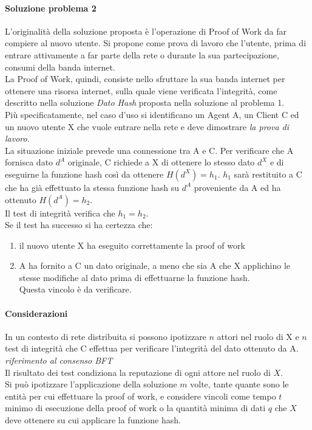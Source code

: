 \documentclass[]{article}
\begin{document}
	\paragraph{Soluzione problema 2}
	L'originalità della soluzione proposta è l'operazione di Proof of Work da far compiere al nuovo utente. Si propone come prova di lavoro che l'utente, prima di entrare attivamente a far parte della rete o durante la sua partecipazione, consumi della banda internet.\\
	La Proof of Work, quindi, consiste nello sfruttare la sua banda internet per ottenere una risorsa internet, sulla quale viene verificata l'integrità, come descritto nella soluzione \textit{Dato Hash} proposta nella soluzione al problema 1.\\ 
	Più specificatamente, nel caso d'uso si identificano un Agent A, un Client C ed un nuovo utente X che vuole entrare nella rete e deve dimostrare \textit{la prova di lavoro}.\\
	La situazione iniziale prevede una connessione tra A e C. Per verificare che A fornisca dato $d^A$ originale, C richiede a X di ottenere lo stesso dato $d^X$ e di eseguirne la funzione hash così da ottenere  $H(d^X)=h_1$. $h_1$ sarà restituito a C che ha già effettuato la stessa funzione hash su $d^A$ proveniente da A ed ha ottenuto $H(d^A) = h_2$.\\
	Il test di integrità verifica che $h_1 = h_2$.\\
	Se il test ha successo si ha certezza che:
	\begin{enumerate}
		\item il nuovo utente X ha eseguito correttamente la proof of work 
		\item A ha fornito a C un dato originale, a meno che sia A che X applichino le stesse modifiche al dato prima di effettuarne la funzione hash.\\Questa vincolo è da verificare.
	\end{enumerate}
	
	\paragraph{Considerazioni}
	In un contesto di rete distribuita si possono ipotizzare $n$ attori nel ruolo di X e $n$ test di integrità che C effettua per verificare l'integrità del dato ottenuto da A. \textit{riferimento al consenso BFT}\\
	Il risultato dei test condiziona la reputazione di ogni attore nel ruolo di $X$.\\
	Si può ipotizzare l'applicazione della soluzione $m$ volte, tante quante sono le entità per cui effettuare la proof of work, e considere vincoli come tempo $t$ minimo di esecuzione della proof of work o la quantità minima di dati $q$ che $X$ deve ottenere su cui applicare la funzione hash.\\
	
\end{document}
